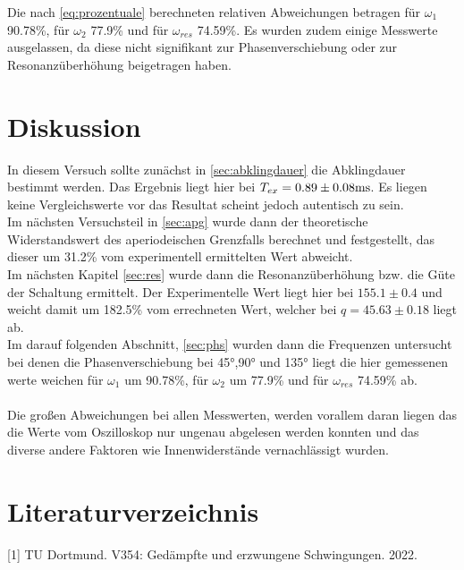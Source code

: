 \documentclass[
  bibliography=totoc,     %
  captions=tableheading,  %
  titlepage=firstiscover, %
]{scrartcl}
\begin{document}
  Die nach \autoref{eq:prozentuale} berechneten relativen Abweichungen betragen für $\omega_1$ 90.78\%, für 
  $\omega_2$ 77.9\% und für $\omega_{res}$ 74.59\%.
  Es wurden zudem einige Messwerte ausgelassen, da diese nicht signifikant zur Phasenverschiebung oder zur Resonanzüberhöhung
  beigetragen haben.
 
  
  \newpage
  \section{Diskussion}
  
  In diesem Versuch sollte zunächst in \autoref{sec:abklingdauer} die Abklingdauer bestimmt 
  werden. Das Ergebnis liegt hier bei $T_{ex} = 0.89\pm 0.08 \si[]{ms}$.
  Es liegen keine Vergleichswerte vor das Resultat scheint jedoch autentisch zu 
  sein.\\ Im nächsten Versuchsteil in \autoref{sec:apg} wurde dann der theoretische
  Widerstandswert des aperiodeischen Grenzfalls berechnet und festgestellt, das dieser
  um 31.2\% vom experimentell ermittelten Wert abweicht.\\ Im nächsten Kapitel
  \autoref{sec:res} wurde dann die Resonanzüberhöhung bzw. die Güte der Schaltung ermittelt.
  Der Experimentelle Wert liegt hier bei $155.1\pm 0.4$ und weicht damit um 182.5\% vom 
  errechneten Wert, welcher bei $q=45.63\pm 0.18$ liegt ab.\\ Im darauf folgenden 
  Abschnitt, \autoref{sec:phs} wurden dann die Frequenzen untersucht bei denen 
  die Phasenverschiebung bei 45°,90° und 135° liegt die hier gemessenen werte weichen für
  $\omega_1$ um 90.78\%, für $\omega_2$ um 77.9\% und für $\omega_{res}$ 74.59\% ab.\\\\ 
  Die großen Abweichungen bei allen Messwerten, werden vorallem daran liegen das 
  die Werte vom Oszilloskop nur ungenau abgelesen werden konnten und das diverse andere
  Faktoren wie Innenwiderstände vernachlässigt wurden.

  \newpage
  \section{Literaturverzeichnis}
  [1] TU Dortmund. V354: Gedämpfte und erzwungene Schwingungen. 2022.
\end{document}
